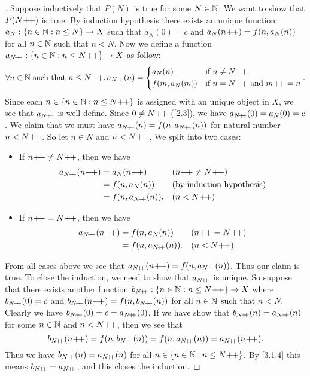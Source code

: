 \begin{proof}[]
	Suppose inductively that \(P(N)\) is true for some \(N \in \mathbb{N}\).
	We want to show that \(P(N\!+\!\!+)\) is true.
	By induction hypothesis there exists an unique function \(a_N : \left\lbrace n \in \mathbb{N} : n \leq N\right\rbrace \to X\) such that \(a_N(0) = c\) and \(a_N(n\!+\!\!+) = f(n, a_N(n))\) for all \(n \in \mathbb{N}\) such that \(n < N\).
	Now we define a function \(a_{N\!+\!\!+} : \left\lbrace n \in \mathbb{N} : n \leq N\!+\!\!+\right\rbrace \to X\) as follow:
	\[
		\forall n \in \N \text{ such that } n \leq N\pp, a_{N\pp}(n) = \begin{dcases}
			a_N(n)       & \text{if } n \neq N\pp                    \\
			f(m, a_N(m)) & \text{if } n = N\pp \text{ and } m\pp = n
		\end{dcases}.
	\]
	Since each \(n \in \left\lbrace n \in \mathbb{N} : n \leq N\!+\!\!+\right\rbrace\) is assigned with an unique object in \(X\), we see that \(a_{N\!+\!\!+}\) is well-define.
	Since \(0 \neq N\!+\!\!+\) (\cref{2.3}), we have \(a_{N\!+\!\!+}(0) = a_N(0) = c\).
	We claim that we must have \(a_{N\!+\!\!+}(n) = f(n, a_{N\!+\!\!+}(n))\) for natural number \(n < N\!+\!\!+\).
	So let \(n \in N\) and \(n < N\!+\!\!+\).
	We split into two cases:
	\begin{itemize}
		\item If \(n\!+\!\!+ \neq N\!+\!\!+\), then we have
		      \begin{align*}
			      a_{N\pp}(n\pp) & = a_N(n\pp)          &  & (n\pp \neq N\pp) \\
			                     & = f(n, a_N(n))       &  & \byIH            \\
			                     & = f(n, a_{N\pp}(n)). &  & (n < N\pp)
		      \end{align*}
		\item If \(n\!+\!\!+ = N\!+\!\!+\), then we have
		      \begin{align*}
			      a_{N\pp}(n\pp) & = f(n, a_N(n))       &  & (n\pp = N\pp) \\
			                     & = f(n, a_{N\pp}(n)). &  & (n < N\pp)
		      \end{align*}
	\end{itemize}
	From all cases above we see that \(a_{N\pp}(n\pp) = f(n, a_{N\pp}(n))\).
	Thus our claim is true.
	To close the induction, we need to show that \(a_{N\!+\!\!+}\) is unique.
	So suppose that there exists another function \(b_{N\!+\!\!+} : \left\lbrace n \in \mathbb{N} : n \leq N\!+\!\!+\right\rbrace \to X\) where \(b_{N\!+\!\!+}(0) = c\) and \(b_{N\pp}(n\pp) = f(n, b_{N\pp}(n))\) for all \(n \in \mathbb{N}\) such that \(n < N\).
	Clearly we have \(b_{N\!+\!\!+}(0) = c = a_{N\!+\!\!+}(0)\).
	If we have show that \(b_{N\!+\!\!+}(n) = a_{N\!+\!\!+}(n)\) for some \(n \in \mathbb{N}\) and \(n < N\!+\!\!+\), then we see that
	\[
		b_{N\pp}(n\pp) = f(n, b_{N\pp}(n)) = f(n, a_{N\pp}(n)) = a_{N\pp}(n\pp).
	\]
	Thus we have \(b_{N\!+\!\!+}(n) = a_{N\!+\!\!+}(n)\) for all \(n \in \left\lbrace n \in \mathbb{N} : n \leq N\!+\!\!+\right\rbrace\).
	By \cref{3.1.4} this means \(b_{N\!+\!\!+} = a_{N\!+\!\!+}\), and this closes the induction.


\end{proof}
